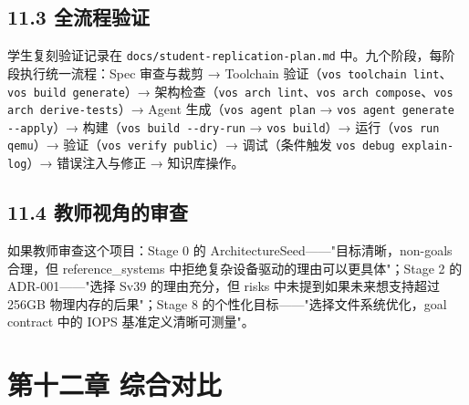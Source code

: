 \documentclass[UTF8,a4paper,12pt,openany]{ctexrep}
\newcommand{\passthrough}[1]{#1}
\begin{document}
\section{11.3 全流程验证}\label{113-ux5168ux6d41ux7a0bux9a8cux8bc1}

学生复刻验证记录在 \passthrough{\lstinline!docs/student-replication-plan.md!} 中。九个阶段，每阶段执行统一流程：Spec 审查与裁剪 → Toolchain 验证（\passthrough{\lstinline!vos toolchain lint!}、\passthrough{\lstinline!vos build generate!}）→ 架构检查（\passthrough{\lstinline!vos arch lint!}、\passthrough{\lstinline!vos arch compose!}、\passthrough{\lstinline!vos arch derive-tests!}）→ Agent 生成（\passthrough{\lstinline!vos agent plan!} → \passthrough{\lstinline!vos agent generate --apply!}）→ 构建（\passthrough{\lstinline!vos build --dry-run!} → \passthrough{\lstinline!vos build!}）→ 运行（\passthrough{\lstinline!vos run qemu!}）→ 验证（\passthrough{\lstinline!vos verify public!}）→ 调试（条件触发 \passthrough{\lstinline!vos debug explain-log!}）→ 错误注入与修正 → 知识库操作。

\section{11.4 教师视角的审查}\label{114-ux6559ux5e08ux89c6ux89d2ux7684ux5ba1ux67e5}

如果教师审查这个项目：Stage 0 的 ArchitectureSeed------"目标清晰，non-goals 合理，但 reference\_systems 中\textquotesingle 拒绝复杂设备驱动\textquotesingle 的理由可以更具体"；Stage 2 的 ADR-001------"选择 Sv39 的理由充分，但 risks 中未提到如果未来想支持超过 256GB 物理内存的后果"；Stage 8 的个性化目标------"选择文件系统优化，goal contract 中的 IOPS 基准定义清晰可测量"。


\chapter{第十二章 综合对比}\label{ux7b2cux5341ux4e8cux7ae0-ux7efcux5408ux5bf9ux6bd4}
\end{document}
